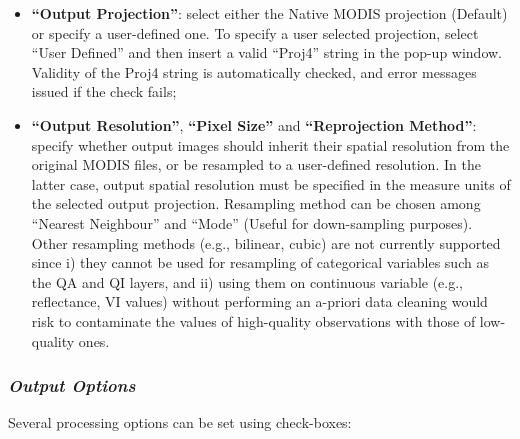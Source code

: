 \documentclass[]{article}
\begin{document}
\begin{itemize}
\item
  \textbf{``Output Projection''}: select either the Native MODIS
  projection (Default) or specify a user-defined one. To specify a user
  selected projection, select ``User Defined'' and then insert a valid
  ``Proj4'' string in the pop-up window. Validity of the Proj4 string is
  automatically checked, and error messages issued if the check fails;
\item
  \textbf{``Output Resolution''}, \textbf{``Pixel Size''} and
  \textbf{``Reprojection Method''}: specify whether output images should
  inherit their spatial resolution from the original MODIS files, or be
  resampled to a user-defined resolution. In the latter case, output
  spatial resolution must be specified in the measure units of the
  selected output projection. Resampling method can be chosen among
  ``Nearest Neighbour'' and ``Mode'' (Useful for down-sampling
  purposes). Other resampling methods (e.g., bilinear, cubic) are not
  currently supported since i) they cannot be used for resampling of
  categorical variables such as the QA and QI layers, and ii) using them
  on continuous variable (e.g., reflectance, VI values) without
  performing an a-priori data cleaning would risk to contaminate the
  values of high-quality observations with those of low-quality ones.
\end{itemize}

\subsubsection{\texorpdfstring{\emph{Output
Options}}{Output Options}}\label{output-options}

Several processing options can be set using check-boxes:
\end{document}
